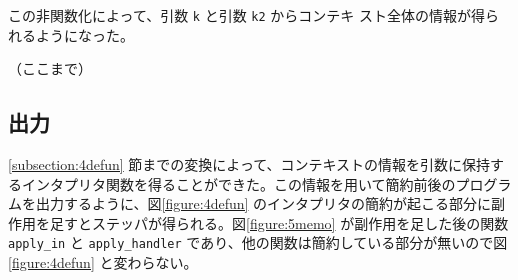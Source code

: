 この非関数化によって、引数 \texttt{k} と引数 \texttt{k2} からコンテキ
スト全体の情報が得られるようになった。

（ここまで）

\subsection{出力}
\label{subsection:memo}

\ref{subsection:4defun} 節までの変換によって、コンテキストの情報を引数に保持するインタプリタ関数を得ることができた。この情報を用いて簡約前後のプログラムを出力するように、図\ref{figure:4defun} のインタプリタの簡約が起こる部分に副作用を足すとステッパが得られる。図\ref{figure:5memo} が副作用を足した後の関数 \texttt{apply\_in} と \texttt{apply\_handler} であり、他の関数は簡約している部分が無いので図 \ref{figure:4defun} と変わらない。

